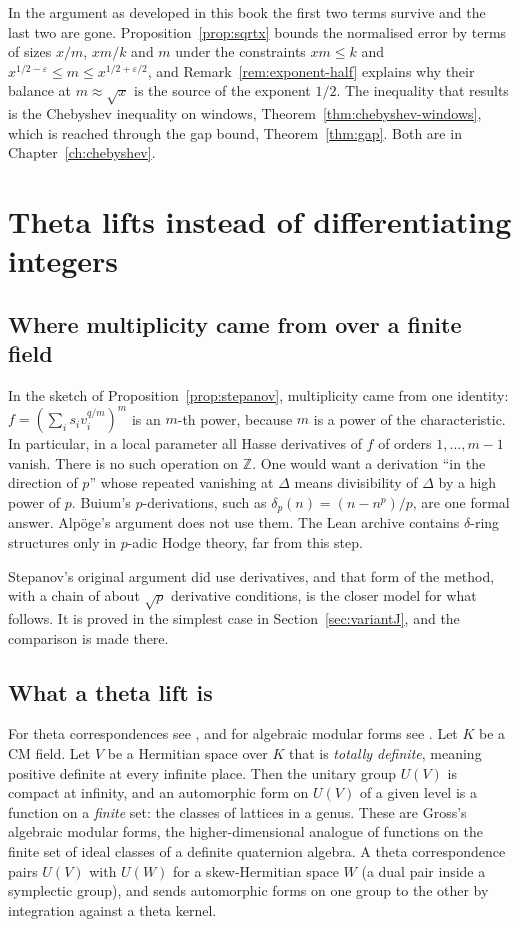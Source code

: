 \documentclass[11pt]{amsbook}
\theoremstyle{plain}
\theoremstyle{definition}
\theoremstyle{remark}
\numberwithin{equation}{section}
\numberwithin{figure}{chapter}
\numberwithin{table}{chapter}
\newcommand{\Z}{\mathbb{Z}}
\newcommand{\eps}{\varepsilon}
\begin{document}
In the argument as developed in this book the first two terms
survive and the last two are gone. Proposition~\ref{prop:sqrtx}
bounds the normalised error by terms of sizes $x/m$, $xm/k$ and $m$
under the constraints $xm \le k$ and
$x^{1/2-\eps} \le m \le x^{1/2+\eps/2}$, and
Remark~\ref{rem:exponent-half} explains why their balance at
$m \approx \sqrt x$ is the source of the exponent $1/2$. The
inequality that results is the Chebyshev inequality on windows,
Theorem~\ref{thm:chebyshev-windows}, which is reached through the
gap bound, Theorem~\ref{thm:gap}. Both are in
Chapter~\ref{ch:chebyshev}.

\section{Theta lifts instead of differentiating integers}
\label{sec:theta}

\subsection{Where multiplicity came from over a finite field}

In the sketch of Proposition~\ref{prop:stepanov}, multiplicity came
from one identity: $f = (\sum_i s_i v_i^{q/m})^m$ is an $m$-th
power, because $m$ is a power of the characteristic. In particular,
in a local parameter all Hasse derivatives of $f$ of orders
$1, \dots, m - 1$ vanish. There is no such operation on $\Z$. One
would want a derivation ``in the direction of $p$'' whose repeated
vanishing at $\Delta$ means divisibility of $\Delta$ by a high power
of $p$. Buium's $p$-derivations, such as
$\delta_p(n) = (n - n^p)/p$, are one formal answer. Alp\"oge's
argument does not use them. The Lean archive contains
$\delta$-ring structures only in $p$-adic Hodge theory, far from
this step.

Stepanov's original argument did use derivatives, and that form of
the method, with a chain of about $\sqrt p$ derivative conditions,
is the closer model for what follows. It is proved in the simplest
case in Section~\ref{sec:variantJ}, and the comparison is made
there.

\subsection{What a theta lift is}

For theta correspondences see \cite{Howe1989,Rallis1984}, and for
algebraic modular forms see \cite{Gross1999}. Let $K$ be a CM field.
Let $V$ be a Hermitian space over $K$ that is \emph{totally
definite}, meaning positive definite at every infinite place. Then
the unitary group $U(V)$ is compact at infinity, and an automorphic
form on $U(V)$ of a given level is a function on a \emph{finite}
set: the classes of lattices in a genus. These are Gross's algebraic
modular forms, the higher-dimensional analogue of functions on the
finite set of ideal classes of a definite quaternion algebra. A
theta correspondence pairs $U(V)$ with $U(W)$ for a skew-Hermitian
space $W$ (a dual pair inside a symplectic group), and sends
automorphic forms on one group to the other by integration against
a theta kernel.
\end{document}
